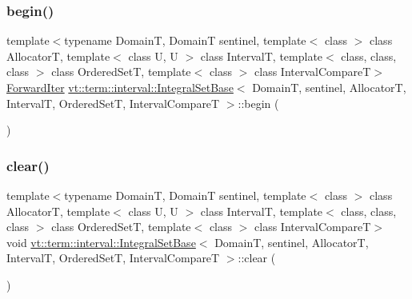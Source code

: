 \subsubsection{\texorpdfstring{begin()}{begin()}}
{\footnotesize\ttfamily template$<$typename DomainT, DomainT sentinel, template$<$ class $>$ class AllocatorT, template$<$ class U, U $>$ class IntervalT, template$<$ class, class, class $>$ class Ordered\+SetT, template$<$ class $>$ class Interval\+CompareT$>$ \\
\hyperlink{structvt_1_1term_1_1interval_1_1_integral_set_base_abd0d7f40a96384d2db0a2782a8921a34}{Forward\+Iter} \hyperlink{structvt_1_1term_1_1interval_1_1_integral_set_base}{vt\+::term\+::interval\+::\+Integral\+Set\+Base}$<$ DomainT, sentinel, AllocatorT, IntervalT, Ordered\+SetT, Interval\+CompareT $>$\+::begin (\begin{DoxyParamCaption}{ }\end{DoxyParamCaption})\hspace{0.3cm}{\ttfamily [inline]}}

\mbox{\label{structvt_1_1term_1_1interval_1_1_integral_set_base_a5786bb488ef808cd89474afa94ecc856}} 
\subsubsection{\texorpdfstring{clear()}{clear()}}
{\footnotesize\ttfamily template$<$typename DomainT, DomainT sentinel, template$<$ class $>$ class AllocatorT, template$<$ class U, U $>$ class IntervalT, template$<$ class, class, class $>$ class Ordered\+SetT, template$<$ class $>$ class Interval\+CompareT$>$ \\
void \hyperlink{structvt_1_1term_1_1interval_1_1_integral_set_base}{vt\+::term\+::interval\+::\+Integral\+Set\+Base}$<$ DomainT, sentinel, AllocatorT, IntervalT, Ordered\+SetT, Interval\+CompareT $>$\+::clear (\begin{DoxyParamCaption}{ }\end{DoxyParamCaption})\hspace{0.3cm}{\ttfamily [inline]}}

\mbox{\label{structvt_1_1term_1_1interval_1_1_integral_set_base_a48ab16ffe03b4285c7210df3084904af}} 
